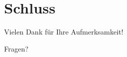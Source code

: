 \documentclass[t,aspectratio=169,divpsnames]{beamer}
\begin{document}
\section*{Schluss}
\begin{frame}
    \begin{center}
        \huge{Vielen Dank für Ihre Aufmerksamkeit!}
    \end{center}
    \begin{center}
        \Huge{Fragen?}
    \end{center}
\end{frame}

\begin{frame}[allowframebreaks]{\bibname}
\end{frame}
\end{document}
